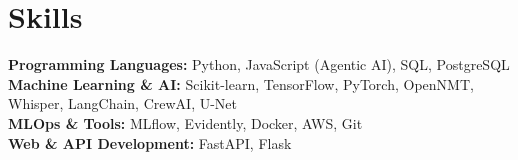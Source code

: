 \documentclass[letterpaper,11pt]{article}
\begin{document}
\section{Skills}
\begin{itemize}[leftmargin=0.15in, label={}]
  \small{\item{
    \textbf{Programming Languages:} Python, JavaScript (Agentic AI), SQL, PostgreSQL \\
    \textbf{Machine Learning \& AI:} Scikit-learn, TensorFlow, PyTorch, OpenNMT, Whisper, LangChain, CrewAI, U-Net \\
    \textbf{MLOps \& Tools:} MLflow, Evidently, Docker, AWS, Git \\
    \textbf{Web \& API Development:} FastAPI, Flask
  }}
\end{itemize}



\end{document}
